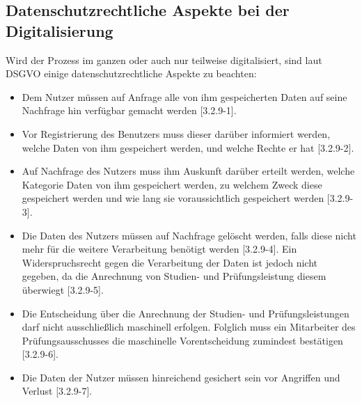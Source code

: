 \subsection{Datenschutzrechtliche Aspekte bei der Digitalisierung}
Wird der Prozess im ganzen oder auch nur teilweise digitalisiert, sind laut DSGVO einige datenschutzrechtliche Aspekte zu beachten:
\begin{itemize}
\item Dem Nutzer müssen auf Anfrage alle von ihm gespeicherten Daten auf seine Nachfrage hin verfügbar gemacht werden [3.2.9-1].
\item Vor Registrierung des Benutzers muss dieser darüber informiert werden, welche Daten von ihm gespeichert werden, und welche Rechte er hat [3.2.9-2].
\item Auf Nachfrage des Nutzers muss ihm Auskunft darüber erteilt werden, welche Kategorie Daten von ihm gespeichert werden, zu welchem Zweck diese gespeichert werden und wie lang sie voraussichtlich gespeichert werden [3.2.9-3].
\item Die Daten des Nutzers müssen auf Nachfrage gelöscht werden, falls diese nicht mehr für die weitere Verarbeitung benötigt werden [3.2.9-4]. Ein Widerspruchsrecht gegen die Verarbeitung der Daten ist jedoch nicht gegeben, da die Anrechnung von Studien- und Prüfungsleistung diesem überwiegt [3.2.9-5].
\item Die Entscheidung über die Anrechnung der Studien- und Prüfungsleistungen darf nicht ausschließlich maschinell erfolgen. Folglich muss ein Mitarbeiter des Prüfungsausschusses die maschinelle Vorentscheidung zumindest bestätigen [3.2.9-6].
\item Die Daten der Nutzer müssen hinreichend gesichert sein vor Angriffen und Verlust [3.2.9-7].
\end{itemize}
